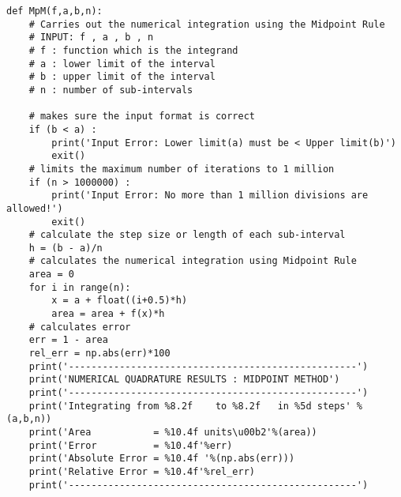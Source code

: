 \documentclass[a4paper, 12pt]{report}
\begin{document}
\begin{lstlisting}
def MpM(f,a,b,n):
    # Carries out the numerical integration using the Midpoint Rule
    # INPUT: f , a , b , n
    # f : function which is the integrand
    # a : lower limit of the interval
    # b : upper limit of the interval
    # n : number of sub-intervals

    # makes sure the input format is correct
    if (b < a) :
        print('Input Error: Lower limit(a) must be < Upper limit(b)')
        exit()
    # limits the maximum number of iterations to 1 million
    if (n > 1000000) :
        print('Input Error: No more than 1 million divisions are allowed!')
        exit()
    # calculate the step size or length of each sub-interval
    h = (b - a)/n
    # calculates the numerical integration using Midpoint Rule
    area = 0
    for i in range(n):
        x = a + float((i+0.5)*h)
        area = area + f(x)*h
    # calculates error
    err = 1 - area
    rel_err = np.abs(err)*100
    print('---------------------------------------------------')
    print('NUMERICAL QUADRATURE RESULTS : MIDPOINT METHOD')
    print('---------------------------------------------------')
    print('Integrating from %8.2f    to %8.2f   in %5d steps' %(a,b,n))
    print('Area           = %10.4f units\u00b2'%(area))
    print('Error          = %10.4f'%err)
    print('Absolute Error = %10.4f '%(np.abs(err)))
    print('Relative Error = %10.4f'%rel_err)
    print('---------------------------------------------------')
\end{lstlisting}
\end{document}
